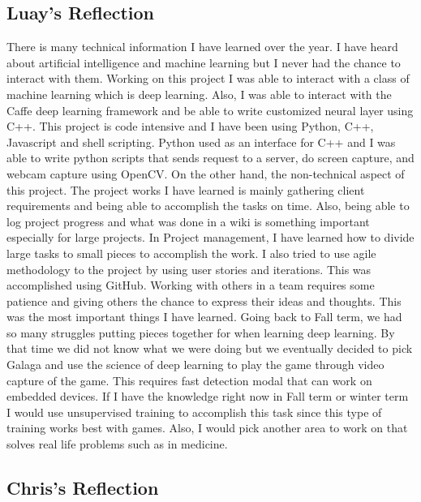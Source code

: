 \documentclass[onecolumn, draftclsnofoot,10pt, compsoc]{IEEEtran}
\begin{document}
\subsection{Luay's Reflection}
There is many technical information I have learned over the year. I have heard about artificial intelligence and machine learning but I never had the chance to interact with them. Working on this project I was able to interact with a class of machine learning which is deep learning. Also, I was able to interact with the Caffe deep learning framework and be able to write customized neural layer using C++. This project is code intensive and I have been using Python, C++, Javascript and shell scripting. Python used as an interface for C++ and I was able to write python scripts that sends request to a server, do screen capture, and webcam capture using OpenCV. On the other hand, the non-technical aspect of this project. \newline
The project works I have learned is mainly gathering client requirements and being able to accomplish the tasks on time. Also, being able to log project progress and what was done in a wiki is something important especially for large projects. \newline
In Project management, I have learned how to divide large tasks to small pieces to accomplish the work. I also tried to use agile methodology to the project by using user stories and iterations. This was accomplished using GitHub.
Working with others in a team requires some patience and giving others the chance to express their ideas and thoughts. This was the most important things I have learned.  \newline
Going back to Fall term, we had so many struggles putting pieces together for when learning deep learning. By that time we did not know what we were doing but we eventually decided to pick Galaga and use the science of deep learning to play the game through video capture of the game. This requires fast detection modal that can work on embedded devices. If I have the knowledge right now in Fall term or winter term I would use unsupervised training to accomplish this task since this type of training works best with games. Also, I would pick another area to work on that solves real life problems such as in medicine.

\subsection{Chris's Reflection}
\end{document}

